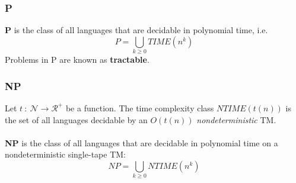 \documentclass{article}
\begin{document}
        \subsubsection{P}
        \textbf{P} is the class of all languages that are decidable in polynomial time, i.e. 
        \[ P = \bigcup_{k \geq 0} TIME(n^k) \]
        Problems in P are known as \textbf{tractable}. 
        \subsubsection{NP}
        Let $t \ : \ \mathcal{N} \to \mathcal{R}^+$ be a function. The time complexity class $NTIME(t(n))$ is the set of all languages decidable by an $O(t(n))$ \textit{nondeterministic} TM. \\ \\
        \textbf{NP} is the class of all languages that are decidable in polynomial time on a nondeterministic single-tape TM:
        \[ NP = \bigcup_{k \geq 0} NTIME(n^k) \]
\end{document}
